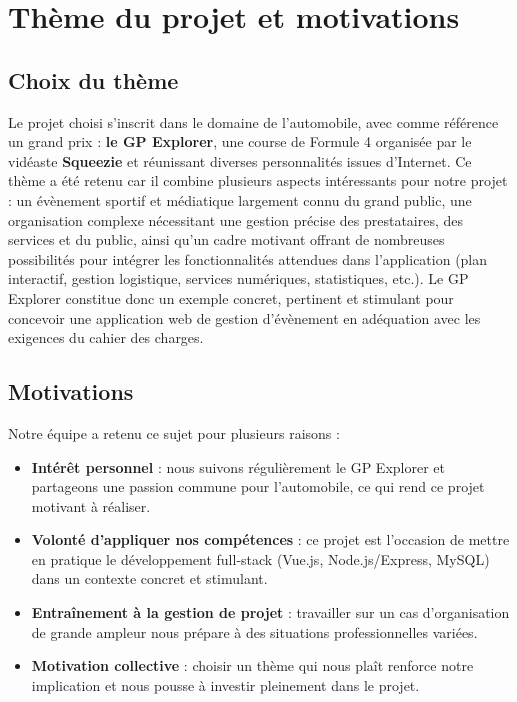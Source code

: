 \documentclass[12pt,a4paper]{article}
\begin{document}
\newpage
\setcounter{page}{2}
\thispagestyle{empty}
\mbox{}
\newpage
\tableofcontents
\thispagestyle{empty}
\newpage
\thispagestyle{empty}
\mbox{}

\newpage

\section{Thème du projet et motivations}

\subsection{Choix du thème}
Le projet choisi s’inscrit dans le domaine de l’automobile, avec comme référence un grand prix : \textbf{le GP Explorer}, une course de Formule 4 organisée par le vidéaste \textbf{Squeezie} et réunissant diverses personnalités issues d’Internet. Ce thème a été retenu car il combine plusieurs aspects intéressants pour notre projet : un évènement sportif et médiatique largement connu du grand public, une organisation complexe nécessitant une gestion précise des prestataires, des services et du public, ainsi qu’un cadre motivant offrant de nombreuses possibilités pour intégrer les fonctionnalités attendues dans l'application (plan interactif, gestion logistique, services numériques, statistiques, etc.). Le GP Explorer constitue donc un exemple concret, pertinent et stimulant pour concevoir une application web de gestion d'évènement en adéquation avec les exigences du cahier des charges.
\subsection{Motivations}
Notre équipe a retenu ce sujet pour plusieurs raisons :  

\begin{itemize}
  \item \textbf{Intérêt personnel} : nous suivons régulièrement le GP Explorer et partageons une passion commune pour l'automobile, ce qui rend ce projet motivant à réaliser.  
  \item \textbf{Volonté d'appliquer nos compétences} : ce projet est l'occasion de mettre en pratique le développement full-stack (Vue.js, Node.js/Express, MySQL) dans un contexte concret et stimulant.  
  \item \textbf{Entraînement à la gestion de projet} : travailler sur un cas d'organisation de grande ampleur nous prépare à des situations professionnelles variées.  
  \item \textbf{Motivation collective} : choisir un thème qui nous plaît renforce notre implication et nous pousse à investir pleinement dans le projet.  
\end{itemize}
\end{document}
